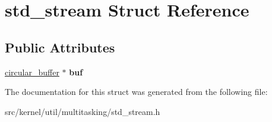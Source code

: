 \hypertarget{structstd__stream}{}\section{std\+\_\+stream Struct Reference}
\label{structstd__stream}
\subsection*{Public Attributes}
\begin{DoxyCompactItemize}
\item 
\mbox{\label{structstd__stream_a567ff945793ce26d6b429269cb9cee3f}} 
\hyperlink{structcircular__buffer}{circular\+\_\+buffer} $\ast$ {\bfseries buf}
\end{DoxyCompactItemize}


The documentation for this struct was generated from the following file\+:\begin{DoxyCompactItemize}
\item 
src/kernel/util/multitasking/std\+\_\+stream.\+h\end{DoxyCompactItemize}
